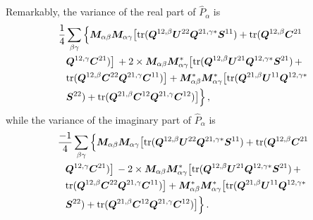 \documentclass[12pt,a4paper]{article}
\begin{document}
Remarkably, the variance of the real part of $\hat{P}_\alpha$ is
\begin{align}
\label{eq:var_in_ps_real}
    &\frac{1}{4} \sum_{\beta\gamma}
    \Big\{\bm{M}_{\alpha\beta} \bm{M}_{\alpha\gamma} \big[ \text{tr}(\bm{Q}^{12,\beta} \bm{U}^{22} \bm{Q}^{21,\gamma*} \bm{S}^{11}) + \text{tr}(\bm{Q}^{12,\beta} \bm{C}^{21}\notag \\
    & \phantom{=} \bm{Q}^{12,\gamma} \bm{C}^{21}) \big]
    \, + 2\times \bm{M}_{\alpha\beta} \bm{M}_{\alpha\gamma}^* \big[ \text{tr}(\bm{Q}^{12,\beta} \bm{U}^{21} \bm{Q}^{12,\gamma *} \bm{S}^{21}) \, + \notag\\
    & \phantom{=} \text{tr}(\bm{Q}^{12,\beta} \bm{C}^{22} \bm{Q}^{21,\gamma} \bm{C}^{11}) \big]
    +\bm{M}_{\alpha\beta}^* \bm{M}_{\alpha\gamma}^* \big[ \text{tr}(\bm{Q}^{21,\beta} \bm{U}^{11} \bm{Q}^{12,\gamma*} \notag\\
    & \phantom{=} \bm{S}^{22})+ \text{tr}( \bm{Q}^{21,\beta} \bm{C}^{12} \bm{Q}^{21,\gamma} \bm{C}^{12}) \big] \Big\}\,,
\end{align}
while the variance of the imaginary part of $\hat{P}_\alpha$ is
\begin{align}
\label{eq:var_in_ps_imag}
   &\frac{-1}{4} \sum_{\beta\gamma} \Big\{ \bm{M}_{\alpha\beta} \bm{M}_{\alpha\gamma} \big[ \text{tr}(\bm{Q}^{12,\beta} \bm{U}^{22} \bm{Q}^{21,\gamma*} \bm{S}^{11}) + \text{tr}(\bm{Q}^{12,\beta} \bm{C}^{21}\notag \\
   & \phantom{=} \bm{Q}^{12,\gamma} \bm{C}^{21}) \big]
   \, - 2 \times \bm{M}_{\alpha\beta} \bm{M}_{\alpha\gamma}^* \big[ \text{tr}(\bm{Q}^{12,\beta} \bm{U}^{21} \bm{Q}^{12,\gamma *} \bm{S}^{21}) \, + \notag\\
   & \phantom{=} \text{tr}(\bm{Q}^{12,\beta} \bm{C}^{22} \bm{Q}^{21,\gamma} \bm{C}^{11}) \big]
    +\bm{M}_{\alpha\beta}^* \bm{M}_{\alpha\gamma}^* \big[ \text{tr}(\bm{Q}^{21,\beta} \bm{U}^{11} \bm{Q}^{12,\gamma*} \notag \\
    & \phantom{=} \bm{S}^{22}) + \text{tr}( \bm{Q}^{21,\beta} \bm{C}^{12} \bm{Q}^{21,\gamma} \bm{C}^{12}) \big] \Big\} \,.
\end{align}
\end{document}
